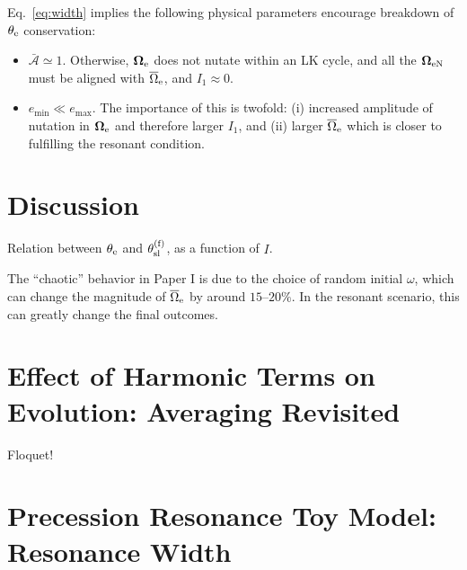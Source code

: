 \documentclass[
        fleqn,
        usenatbib,
    ]{mnras}
\newcommand*{\bm}[1]{\boldsymbol{\mathbf{#1}}}
\begin{document}
Eq.~\eqref{eq:width} implies the following physical parameters encourage
breakdown of $\theta_{\rm e}$ conservation:
\begin{itemize}
    \item $\bar{\mathcal{A}} \simeq 1$. Otherwise, $\bm{\Omega}_{\rm
        e}$ does not nutate within an LK cycle, and all the $\bm{\Omega}_{\rm
        eN}$ must be aligned with $\overline{\Omega}_{\rm e}$, and $I_1 \approx
        0$.

    \item $e_{\min} \ll e_{\max}$. The importance of this is twofold: (i)
        increased amplitude of nutation in $\bm{\Omega}_{\rm e}$ and therefore
        larger $I_1$, and (ii) larger $\overline{\Omega}_{\rm e}$ which is
        closer to fulfilling the resonant condition.
\end{itemize}

\section{Discussion}

Relation between $\theta_{\rm e}$ and $\theta_{\rm sl}^{\rm (f)}$, as a function
of $I$.

The ``chaotic'' behavior in Paper I is due to the choice of random initial
$\omega$, which can change the magnitude of $\overline{\Omega}_{\rm e}$ by
around $15$--$20\%$. In the resonant scenario, this can greatly change the final
outcomes.




\clearpage
\onecolumn
\appendix

\section{Effect of Harmonic Terms on Evolution: Averaging Revisited
}\label{s:harmonic}

Floquet!



\section{Precession Resonance Toy Model: Resonance Width}\label{app:width}

\bsp
\label{lastpage} %
\end{document}
